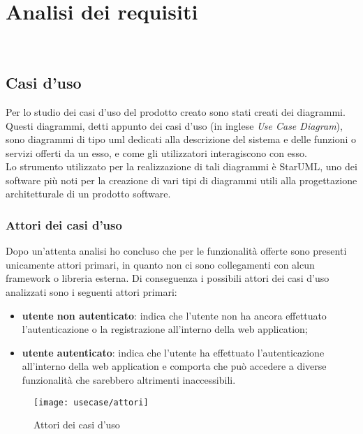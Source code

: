 
\chapter{Analisi dei requisiti}
\label{cap:analisi-requisiti}

\\

\section{Casi d'uso}

Per lo studio dei casi d'uso del prodotto creato sono stati creati dei diagrammi.
Questi diagrammi, detti appunto dei casi d'uso (in inglese \emph{Use Case Diagram}), sono diagrammi di tipo \gls{uml} dedicati alla descrizione del sistema e delle funzioni o servizi offerti da un esso, e come gli utilizzatori interagiscono con esso.\\
Lo strumento utilizzato per la realizzazione di tali diagrammi è StarUML, uno dei software più noti per la creazione di vari tipi di diagrammi utili alla progettazione architetturale di un prodotto software.

\subsection{Attori dei casi d'uso}
Dopo un'attenta analisi ho concluso che per le funzionalità offerte sono presenti unicamente attori primari, in quanto non ci sono collegamenti con alcun framework o libreria esterna.
Di conseguenza i possibili attori dei casi d'uso analizzati sono i seguenti attori primari:
\begin{itemize}
	\item \textbf{utente non autenticato}: indica che l'utente non ha ancora effettuato l'autenticazione o la registrazione all'interno della web application;
	\item \textbf{utente autenticato}: indica che l'utente ha effettuato l'autenticazione all'interno della web application e comporta che può accedere a diverse funzionalità che sarebbero altrimenti inaccessibili.
\end{itemize}
\begin{figure}[H] 
	\centering 
	\texttt{[image: usecase/attori]} 
	\caption{Attori dei casi d'uso}
\end{figure}

